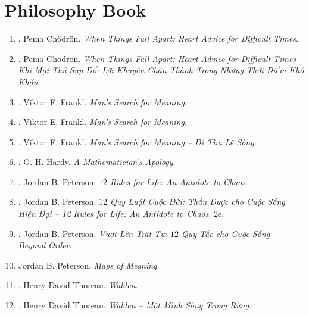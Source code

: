 \documentclass{article}
\begin{document}

\section{Philosophy Book}

\begin{enumerate}
	\item \cite{Chodron2002}. Pema Ch\"odr\"on. \textit{When Things Fall Apart: Heart Advice for Difficult Times}.\hfill{\sf[downloaded]}
	\item \cite{Chodron2021}. Pema Ch\"odr\"on. \textit{When Things Fall Apart: Heart Advice for Difficult Times -- Khi Mọi Thứ Sụp Đổ: Lời Khuyên Chân Thành Trong Những Thời Điểm Khó Khăn}.\hfill{}
	\item \cite{Frankl2013}. Viktor E. Frankl. \textit{Man's Search for Meaning}.\hfill{\sf[downloaded]}
	\item \cite{Frankl2017}. Viktor E. Frankl. \textit{Man's Search for Meaning}.\hfill{\sf[downloaded]}
	\item \cite{Frankl2022}. Viktor E. Frankl. \textit{Man's Search for Meaning -- Đi Tìm Lẽ Sống}.\hfill{}
	\item \cite{Hardy1940, Hardy1992, Hardy2022}. G. H. Hardy. \textit{A Mathematician's Apology}.\hfill{}
	\item \cite{Peterson2018}. Jordan B. Peterson. \textit{$12$ Rules for Life: An Antidote to Chaos}.\hfill{}
	\item \cite{Peterson2022a}. Jordan B. Peterson. \textit{$12$ Quy Luật Cuộc Đời: Thần Dược cho Cuộc Sống Hiện Đại -- 12 Rules for Life: An Antidote to Chaos}. 2e.\hfill{}
	\item \cite{Peterson2022b}. Jordan B. Peterson. \textit{Vượt Lên Trật Tự: $12$ Quy Tắc cho Cuộc Sống -- Beyond Order}.\hfill{}
	\item Jordan B. Peterson. \textit{Maps of Meaning}.\hfill{\sf[downloaded]}
	\item \cite{Thoreau2014}. Henry David Thoreau. \textit{Walden}.\hfill{}
	\item \cite{Thoreau2023}. Henry David Thoreau. \textit{Walden -- Một Mình Sống Trong Rừng}.\hfill{}
\end{enumerate}

\end{document}

